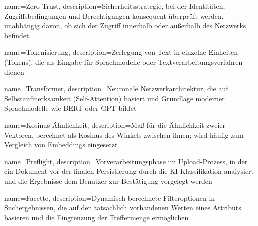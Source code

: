{
    name=Zero Trust,
    description={Sicherheitsstrategie, bei der Identitäten, Zugriffsbedingungen und Berechtigungen konsequent überprüft werden, unabhängig davon, ob sich der Zugriff innerhalb oder außerhalb des Netzwerks befindet}
}

{
    name=Tokenisierung,
    description={Zerlegung von Text in einzelne Einheiten (Tokens), die als Eingabe für Sprachmodelle oder Textverarbeitungsverfahren dienen}
}

{
    name=Transformer,
    description={Neuronale Netzwerkarchitektur, die auf Selbstaufmerksamkeit (Self-Attention) basiert und Grundlage moderner Sprachmodelle wie BERT oder GPT bildet}
}

{
    name=Kosinus-Ähnlichkeit,
    description={Maß für die Ähnlichkeit zweier Vektoren, berechnet als Kosinus des Winkels zwischen ihnen; wird häufig zum Vergleich von Embeddings eingesetzt}
}

{
    name=Preflight,
    description={Vorverarbeitungsphase im Upload-Prozess, in der ein Dokument vor der finalen Persistierung durch die KI-Klassifikation analysiert und die Ergebnisse dem Benutzer zur Bestätigung vorgelegt werden}
}

{
    name=Facette,
    description={Dynamisch berechnete Filteroptionen in Suchergebnissen, die auf den tatsächlich vorhandenen Werten eines Attributs basieren und die Eingrenzung der Treffermenge ermöglichen}
}
